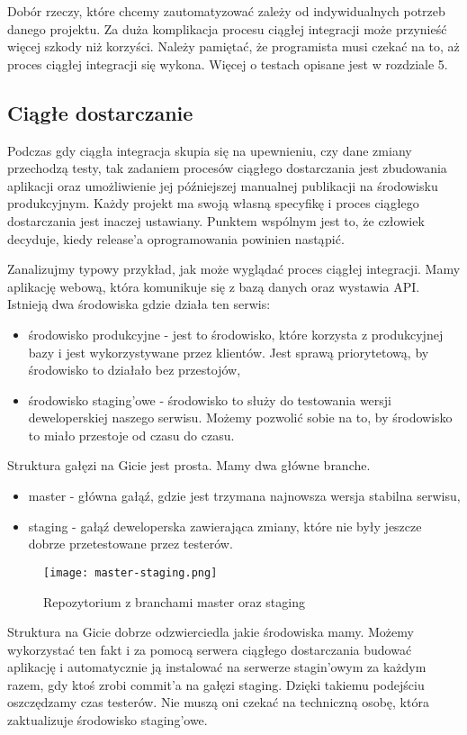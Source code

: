 Dobór rzeczy, które chcemy zautomatyzować zależy od indywidualnych potrzeb danego projektu. Za duża komplikacja procesu ciągłej integracji może przynieść więcej szkody niż korzyści. Należy pamiętać, że programista musi czekać na to, aż proces ciągłej integracji się wykona.
Więcej o testach opisane jest w rozdziale 5.
\subsection{Ciągłe dostarczanie}
Podczas gdy ciągła integracja skupia się na upewnieniu, czy dane zmiany przechodzą testy, tak zadaniem procesów ciągłego dostarczania jest zbudowania aplikacji oraz umożliwienie jej późniejszej manualnej publikacji na środowisku produkcyjnym. Każdy projekt ma swoją własną specyfikę i proces ciągłego dostarczania jest inaczej ustawiany. Punktem wspólnym jest to, że człowiek decyduje, kiedy release'a oprogramowania powinien nastąpić.
\par
Zanalizujmy typowy przykład, jak może wyglądać proces ciągłej integracji. Mamy aplikację webową, która komunikuje się z bazą danych oraz wystawia API. Istnieją dwa środowiska gdzie działa ten serwis:
\begin{itemize}
    \item środowisko produkcyjne - jest to środowisko, które korzysta z produkcyjnej bazy i jest wykorzystywane przez klientów. Jest sprawą priorytetową, by środowisko to działało bez przestojów,
    \item środowisko staging'owe - środowisko to służy do testowania wersji deweloperskiej naszego serwisu. Możemy pozwolić sobie na to, by środowisko to miało przestoje od czasu do czasu.
\end{itemize}
Struktura gałęzi na Gicie jest prosta. Mamy dwa główne branche.
\begin{itemize}
    \item master - główna gałąź, gdzie jest trzymana najnowsza wersja stabilna serwisu,
    \item staging - gałąź deweloperska zawierająca zmiany, które nie były jeszcze dobrze przetestowane przez testerów.
\end{itemize}
\begin{figure}[htbp]
    \centering
    \texttt{[image: master-staging.png]}
    \caption{Repozytorium z branchami master oraz staging}
    \label{fig:git}
\end{figure}
Struktura na Gicie dobrze odzwierciedla jakie środowiska mamy. Możemy wykorzystać ten fakt i za pomocą serwera ciągłego dostarczania budować aplikację i automatycznie ją instalować na serwerze stagin'owym za każdym razem, gdy ktoś zrobi commit'a na gałęzi staging. Dzięki takiemu podejściu oszczędzamy czas testerów. Nie muszą oni czekać na techniczną osobę, która zaktualizuje środowisko staging'owe. 
